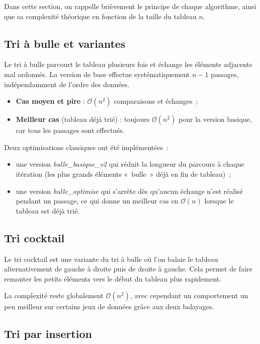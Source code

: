\documentclass[11pt,a4paper]{article}
\begin{document}
Dans cette section, on rappelle brièvement le principe de chaque
algorithme, ainsi que sa complexité théorique en fonction de la taille
du tableau $n$.

\subsection{Tri à bulle et variantes}

Le tri à bulle parcourt le tableau plusieurs fois et échange les
éléments adjacents mal ordonnés.  
La version de base effectue systématiquement $n-1$ passages, indépendamment
de l'ordre des données.

\begin{itemize}
  \item \textbf{Cas moyen et pire} : $\mathcal{O}(n^2)$ comparaisons et échanges~;
  \item \textbf{Meilleur cas} (tableau déjà trié) : toujours $\mathcal{O}(n^2)$
        pour la version basique, car tous les passages sont effectués.
\end{itemize}

Deux optimisations classiques ont été implémentées~:

\begin{itemize}
  \item une version \emph{bulle\_basique\_v2} qui réduit la longueur
        du parcours à chaque itération (les plus grands éléments «~bulle~»
        déjà en fin de tableau)~;
  \item une version \emph{bulle\_optimise} qui s'arrête dès qu'aucun
        échange n'est réalisé pendant un passage, ce qui donne un
        meilleur cas en $\mathcal{O}(n)$ lorsque le tableau est déjà trié.
\end{itemize}

\subsection{Tri cocktail}

Le tri cocktail est une variante du tri à bulle où l'on balaie le
tableau alternativement de gauche à droite puis de droite à gauche.
Cela permet de faire remonter les petits éléments vers le début du
tableau plus rapidement.

La complexité reste globalement $\mathcal{O}(n^2)$, avec cependant un
comportement un peu meilleur sur certains jeux de données grâce aux
deux balayages.

\subsection{Tri par insertion}
\end{document}
